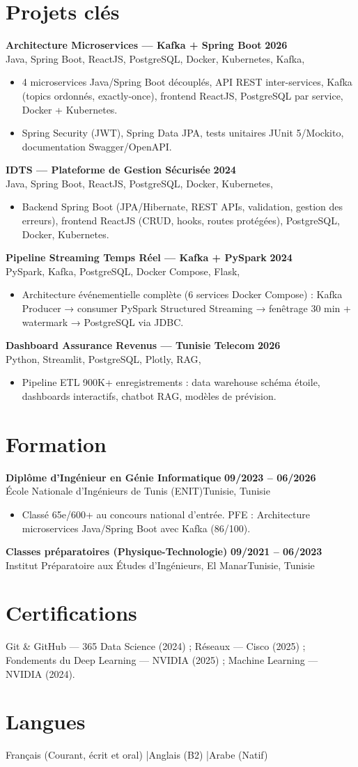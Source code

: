 \documentclass[a4paper,10pt]{article}
\newcommand{\cventry}[4]{\textbf{#1} \hfill \textbf{#4}\\[0.5pt]#2{\ifx\relax#3\relax\else, #3\fi}\par\vspace{1pt}}
\begin{document}
\section{Projets clés}
\cventry{Architecture Microservices --- Kafka + Spring Boot}{Java, Spring Boot, ReactJS, PostgreSQL, Docker, Kubernetes, Kafka}{}{2026}
\begin{itemize}
  \item 4 microservices Java/Spring Boot découplés, API REST inter-services, Kafka (topics ordonnés, exactly-once), frontend ReactJS, PostgreSQL par service, Docker + Kubernetes.
  \item Spring Security (JWT), Spring Data JPA, tests unitaires JUnit 5/Mockito, documentation Swagger/OpenAPI.
\end{itemize}
\cventry{IDTS --- Plateforme de Gestion Sécurisée}{Java, Spring Boot, ReactJS, PostgreSQL, Docker, Kubernetes}{}{2024}
\begin{itemize}
  \item Backend Spring Boot (JPA/Hibernate, REST APIs, validation, gestion des erreurs), frontend ReactJS (CRUD, hooks, routes protégées), PostgreSQL, Docker, Kubernetes.
\end{itemize}

\cventry{Pipeline Streaming Temps Réel --- Kafka + PySpark}{PySpark, Kafka, PostgreSQL, Docker Compose, Flask}{}{2024}
\begin{itemize}
  \item Architecture événementielle complète (6 services Docker Compose) : Kafka Producer → consumer PySpark Structured Streaming → fenêtrage 30 min + watermark → PostgreSQL via JDBC.
\end{itemize}
\cventry{Dashboard Assurance Revenus --- Tunisie Telecom}{Python, Streamlit, PostgreSQL, Plotly, RAG}{}{2026}
\begin{itemize}
  \item Pipeline ETL 900K+ enregistrements : data warehouse schéma étoile, dashboards interactifs, chatbot RAG, modèles de prévision.
\end{itemize}

\section{Formation}
\cventry{Diplôme d'Ingénieur en Génie Informatique}{École Nationale d'Ingénieurs de Tunis (ENIT)}{Tunisie}{09/2023 -- 06/2026}
\begin{itemize}
  \item Classé 65e/600+ au concours national d'entrée. PFE : Architecture microservices Java/Spring Boot avec Kafka (86/100).
\end{itemize}
\cventry{Classes préparatoires (Physique-Technologie)}{Institut Préparatoire aux Études d'Ingénieurs, El Manar}{Tunisie}{09/2021 -- 06/2023}

\section{Certifications}
Git \& GitHub --- 365 Data Science (2024) ; Réseaux --- Cisco (2025) ; Fondements du Deep Learning --- NVIDIA (2025) ; Machine Learning --- NVIDIA (2024).

\section{Langues}
Français (Courant, écrit et oral) \quad|\quad Anglais (B2) \quad|\quad Arabe (Natif)
\end{document}
